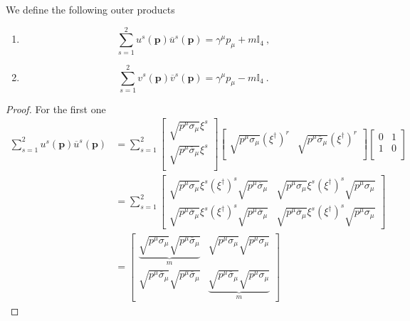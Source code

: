     We define the following outer products 
    \begin{enumerate}
        \item \begin{equation*}
            \sum_{s=1}^{2} u^s (\mathbf p) \overline u^s(\mathbf p) = \gamma^\mu p_\mu + m \mathbb I_4 ~,
        \end{equation*} 
        \item \begin{equation*}
            \sum_{s=1}^{2} v^s (\mathbf p) \overline v^s(\mathbf p) = \gamma^\mu p_\mu - m \mathbb I_4 ~.
        \end{equation*} 
    \end{enumerate}
    \begin{proof}
        For the first one
        \begin{equation*}
        \begin{aligned}
            \sum_{s=1}^{2} u^s (\mathbf p) \overline u^s(\mathbf p) & = \sum_{s=1}^{2} \begin{bmatrix}
                \sqrt{ p^\mu \sigma_\mu} \xi^s \\ \sqrt{ p^\mu \overline \sigma_\mu} \xi^s \\
            \end{bmatrix} \begin{bmatrix}
                \sqrt{p^\mu \sigma_\mu} (\xi^\dagger)^r & \sqrt{p^\mu \overline \sigma_\mu} (\xi^\dagger)^r \\
            \end{bmatrix} \begin{bmatrix}
                0 & 1 \\ 1 & 0 \\
            \end{bmatrix} \\ & = \sum_{s=1}^{2} \begin{bmatrix}
                \sqrt{p^\mu \sigma_\mu} \xi^s (\xi^\dagger)^s \sqrt{p^\mu \overline \sigma_\mu} & \sqrt{p^\mu \sigma_\mu} \xi^s (\xi^\dagger)^s \sqrt{p^\mu \sigma_\mu} \\ \sqrt{p^\mu \overline \sigma_\mu} \xi^s (\xi^\dagger)^s \sqrt{p^\mu \overline \sigma_\mu} & \sqrt{p^\mu \overline \sigma_\mu} \xi^s (\xi^\dagger)^s \sqrt{p^\mu \sigma_\mu} 
            \end{bmatrix} \\ & = \begin{bmatrix}
                \underbrace{\sqrt{p^\mu \sigma_\mu} \sqrt{p^\mu \overline \sigma_\mu}}_m & \sqrt{p^\mu \sigma_\mu} \sqrt{p^\mu \sigma_\mu} \\ \sqrt{p^\mu \overline \sigma_\mu} \sqrt{p^\mu \overline \sigma_\mu} & \underbrace{\sqrt{p^\mu \overline \sigma_\mu} \sqrt{p^\mu \sigma_\mu}}_m

\end{bmatrix}
\end{aligned}
\end{equation*}
\end{proof}
